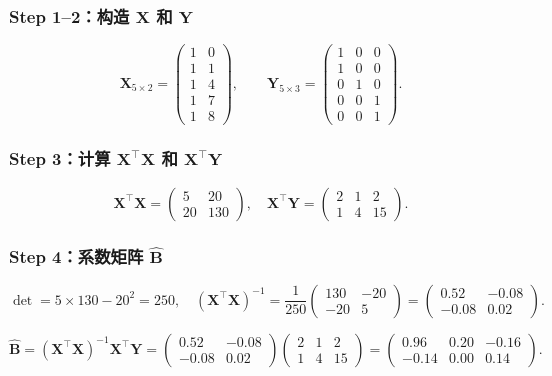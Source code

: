 \subsubsection{Step 1--2：构造 $\mathbf{X}$ 和 $\mathbf{Y}$}

\[
\mathbf{X}_{5\times 2} = 
\begin{pmatrix}
1 & 0 \\
1 & 1 \\
1 & 4 \\
1 & 7 \\
1 & 8
\end{pmatrix},
\qquad
\mathbf{Y}_{5\times 3} = 
\begin{pmatrix}
1 & 0 & 0 \\
1 & 0 & 0 \\
0 & 1 & 0 \\
0 & 0 & 1 \\
0 & 0 & 1
\end{pmatrix}.
\]

\subsubsection{Step 3：计算 $\mathbf{X}^\top\mathbf{X}$ 和 $\mathbf{X}^\top\mathbf{Y}$}

\[
\mathbf{X}^\top\mathbf{X} = 
\begin{pmatrix}
5 & 20 \\
20 & 130
\end{pmatrix},
\quad
\mathbf{X}^\top\mathbf{Y} = 
\begin{pmatrix}
2 & 1 & 2 \\
1 & 4 & 15
\end{pmatrix}.
\]

\subsubsection{Step 4：系数矩阵 $\hat{\mathbf{B}}$}

\[
\det = 5 \times 130 - 20^2 = 250,\quad
(\mathbf{X}^\top\mathbf{X})^{-1} = \frac1{250}
\begin{pmatrix}
130 & -20 \\
-20 & 5
\end{pmatrix}
= \begin{pmatrix}
0.52 & -0.08 \\
-0.08 & 0.02
\end{pmatrix}.
\]

\[
\hat{\mathbf{B}} = (\mathbf{X}^\top\mathbf{X})^{-1}\mathbf{X}^\top\mathbf{Y}
= \begin{pmatrix}
0.52 & -0.08 \\
-0.08 & 0.02
\end{pmatrix}
\begin{pmatrix}
2 & 1 & 2 \\
1 & 4 & 15
\end{pmatrix}
= \begin{pmatrix}
0.96 & 0.20 & -0.16 \\
-0.14 & 0.00 & 0.14
\end{pmatrix}.
\]

